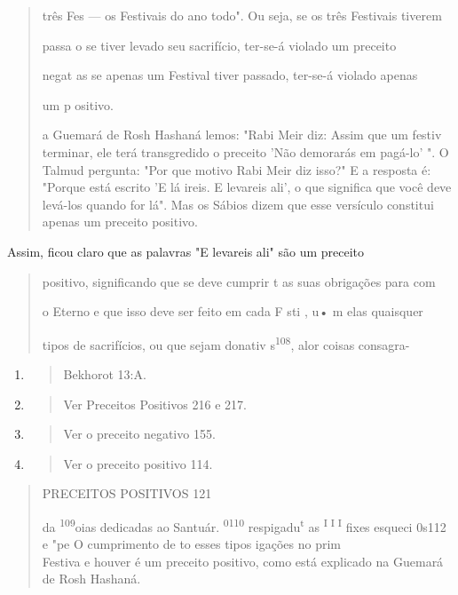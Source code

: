 \begin{quote}
três Fes --- os Festivais do ano todo". Ou seja, se os três Festivais
tiverem

passa o se tiver levado seu sacrifício, ter-se-á violado um preceito

negat as se apenas um Festival tiver passado, ter-se-á violado apenas

um p ositivo.

a Guemará de Rosh Hashaná lemos: "Rabi Meir diz: Assim que um festiv
terminar, ele terá transgredido o preceito 'Não demorarás em pagá-lo' ".
O Talmud pergunta: "Por que motivo Rabi Meir diz isso?" E a resposta é:
"Por­que está escrito 'E lá ireis. E levareis ali', o que significa que
você deve levá-los quando for lá". Mas os Sábios dizem que esse
versículo constitui apenas um preceito positivo.
\end{quote}

Assim, ficou claro que as palavras "E levareis ali" são um preceito

\begin{quote}
positivo, significando que se deve cumprir t as suas obrigações para com

o Eterno e que isso deve ser feito em cada F sti , u• m elas quaisquer

tipos de sacrifícios, ou que sejam donativ s\textsuperscript{108}, alor
coisas consagra-
\end{quote}

\begin{enumerate}
\def\labelenumi{\arabic{enumi}.}
\setcounter{enumi}{104}
\item
  \begin{quote}
  Bekhorot 13:A.
  \end{quote}
\item
  \begin{quote}
  Ver Preceitos Positivos 216 e 217.
  \end{quote}
\item
  \begin{quote}
  Ver o preceito negativo 155.
  \end{quote}
\item
  \begin{quote}
  Ver o preceito positivo 114.
  \end{quote}
\end{enumerate}

\begin{quote}
PRECEITOS POSITIVOS 121

da \textsuperscript{109}oias dedicadas ao Santuár.
\textsuperscript{0110} respigadu\textsuperscript{t} as
\textsuperscript{I I I} fixes esqueci 0s112 e "pe O cumprimento de to
esses tipos igações no prim\\
Festiva e houver é um preceito positivo, como está explicado na Guemará
de Rosh Hashaná.
\end{quote}


